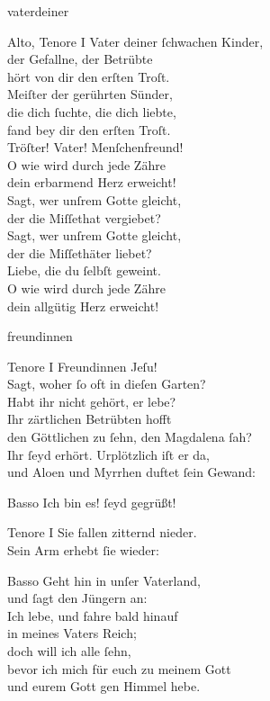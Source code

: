 \documentclass[tocstyle=ref-genre]{ees}
\begin{document}
{\begin{movement}{vaterdeiner}
  \item[Alto, Tenore I]
  Vater deiner ſchwachen Kinder,\\
  der Gefallne, der Betrübte\\
  hört von dir den erſten Troſt.\\
  Meiſter der gerührten Sünder,\\
  die dich ſuchte, die dich liebte,\\
  fand bey dir den erſten Troſt.\\
  Tröſter! Vater! Menſchenfreund!\\
  O wie wird durch jede Zähre\\
  dein erbarmend Herz erweicht!\\
  Sagt, wer unſrem Gotte gleicht,\\
  der die Miſſethat vergiebet?\\
  Sagt, wer unſrem Gotte gleicht,\\
  der die Miſſethäter liebet?\\
  Liebe, die du ſelbſt geweint.\\
  O wie wird durch jede Zähre\\
  dein allgütig Herz erweicht!
\end{movement}

\begin{movement}{freundinnen}
  \item[Tenore I]
  Freundinnen Jeſu!\\
  Sagt, woher ſo oft in dieſen Garten?\\
  Habt ihr nicht gehört, er lebe?\\
  Ihr zärtlichen Betrübten hofft\\
  den Göttlichen zu ſehn, den Magdalena ſah?\\
  Ihr ſeyd erhört. Urplötzlich iſt er da,\\
  und Aloen und Myrrhen duftet ſein Gewand:

  \item[Basso]
  Ich bin es! ſeyd gegrüßt!

  \item[Tenore I]
  Sie fallen zitternd nieder.\\
  Sein Arm erhebt ſie wieder:

  \item[Basso]
  Geht hin in unſer Vaterland,\\
  und ſagt den Jüngern an:\\
  Ich lebe, und fahre bald hinauf\\
  in meines Vaters Reich;\\
  doch will ich alle ſehn,\\
  bevor ich mich für euch zu meinem Gott\\
  und eurem Gott gen Himmel hebe.
\end{movement}

}
\end{document}
